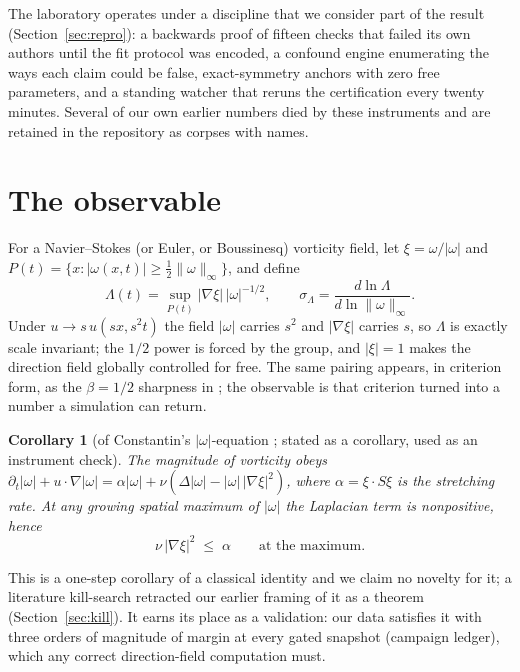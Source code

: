 \documentclass[11pt]{article}
\newtheorem{corollary}{Corollary}
\newcommand{\om}{\omega}
\newcommand{\vinf}{\|\om\|_\infty}
\newcommand{\Lam}{\Lambda}
\newcommand{\sL}{\sigma_{\!\Lambda}}
\begin{document}
The laboratory operates under a discipline that we consider part of the
result (Section~\ref{sec:repro}): a backwards proof of fifteen checks that
failed its own authors until the fit protocol was encoded, a confound
engine enumerating the ways each claim could be false, exact-symmetry
anchors with zero free parameters, and a standing watcher that reruns the
certification every twenty minutes. Several of our own earlier numbers
died by these instruments and are retained in the repository as corpses
with names.

\section{The observable}\label{sec:obs}

For a Navier--Stokes (or Euler, or Boussinesq) vorticity field, let
$\xi=\om/|\om|$ and $P(t)=\{x : |\om(x,t)|\ge\tfrac12\vinf\}$, and define
\begin{equation}
\Lam(t)=\sup_{P(t)}|\nabla\xi|\,|\om|^{-1/2},
\qquad
\sL=\frac{d\ln\Lam}{d\ln\vinf}.
\end{equation}
Under $u\to s\,u(sx,s^2t)$ the field $|\om|$ carries $s^2$ and
$|\nabla\xi|$ carries $s$, so $\Lam$ is exactly scale invariant; the $1/2$
power is forced by the group, and $|\xi|=1$ makes the direction field
globally controlled for free. The same pairing appears, in criterion form,
as the $\beta=1/2$ sharpness in \cite{BdVB02,BdVB09}; the observable is
that criterion turned into a number a simulation can return.

\begin{corollary}[of Constantin's $|\om|$-equation \cite{Con94}; stated as
a corollary, used as an instrument check]\label{cor:zero}
The magnitude of vorticity obeys
$\partial_t|\om|+u\!\cdot\!\nabla|\om|
=\alpha|\om|+\nu\left(\Delta|\om|-|\om|\,|\nabla\xi|^2\right)$,
where $\alpha=\xi\!\cdot\! S\xi$ is the stretching rate. At any growing
spatial maximum of $|\om|$ the Laplacian term is nonpositive, hence
\begin{equation}
\nu\,|\nabla\xi|^2\;\le\;\alpha \qquad\text{at the maximum.}
\end{equation}
\end{corollary}

This is a one-step corollary of a classical identity and we claim no
novelty for it; a literature kill-search retracted our earlier framing of
it as a theorem (Section~\ref{sec:kill}). It earns its place as a
validation: our data satisfies it with three orders of magnitude of margin
at every gated snapshot (campaign ledger), which any correct
direction-field computation must.
\end{document}
